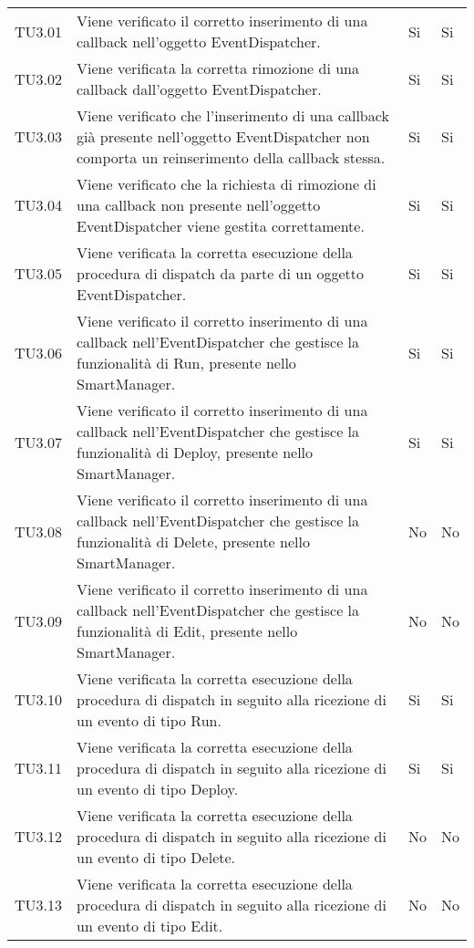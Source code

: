 \begin{longtable}{
		>{\centering}p{}
		>{}p{}
		>{\centering}p{}
		>{\centering}p{} }
TU3.01 & Viene verificato il corretto inserimento di una callback nell'oggetto EventDispatcher.  & Si & Si \tabularnewline

TU3.02 & Viene verificata la corretta rimozione di una callback dall'oggetto EventDispatcher.  & Si & Si \tabularnewline

TU3.03 & Viene verificato che l'inserimento di una callback già presente nell'oggetto EventDispatcher non comporta un reinserimento della callback stessa.& Si & Si \tabularnewline

TU3.04 & Viene verificato che la richiesta di rimozione di una callback non presente nell'oggetto EventDispatcher viene gestita correttamente. & Si & Si \tabularnewline

TU3.05 & Viene verificata la corretta esecuzione della procedura di dispatch da parte di un oggetto EventDispatcher.  & Si & Si \tabularnewline

TU3.06 & Viene verificato il corretto inserimento di una callback nell'EventDispatcher che gestisce la funzionalità di Run, presente nello SmartManager. & Si & Si \tabularnewline

TU3.07 & Viene verificato il corretto inserimento di una callback nell'EventDispatcher che gestisce la funzionalità di Deploy, presente nello SmartManager. & Si & Si \tabularnewline

TU3.08 & Viene verificato il corretto inserimento di una callback nell'EventDispatcher che gestisce la funzionalità di Delete, presente nello SmartManager. & No & No \tabularnewline

TU3.09 & Viene verificato il corretto inserimento di una callback nell'EventDispatcher che gestisce la funzionalità di Edit, presente nello SmartManager. & No & No \tabularnewline

TU3.10 & Viene verificata la corretta esecuzione della procedura di dispatch in seguito alla ricezione di un evento di tipo Run. & Si & Si \tabularnewline

TU3.11 & Viene verificata la corretta esecuzione della procedura di dispatch in seguito alla ricezione di un evento di tipo Deploy. & Si & Si \tabularnewline

TU3.12 & Viene verificata la corretta esecuzione della procedura di dispatch in seguito alla ricezione di un evento di tipo Delete. & No & No \tabularnewline

TU3.13 & Viene verificata la corretta esecuzione della procedura di dispatch in seguito alla ricezione di un evento di tipo Edit. & No & No \tabularnewline


\end{longtable}
